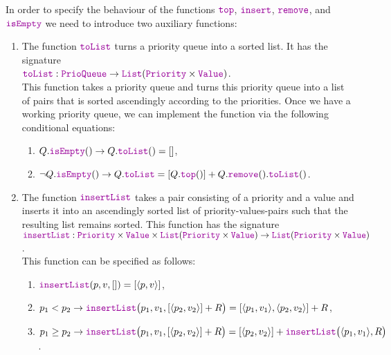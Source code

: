 \begin{Definition}
\begin{enumerate}
      In order to specify the behaviour of the functions $\mytt{top}$, $\mytt{insert}$, $\mytt{remove}$,
      and $\mytt{isEmpty}$ we need to introduce two auxiliary functions:  
      \begin{enumerate}
      \item The function $\mytt{toList}$ turns a priority queue into a sorted list.  It has the signature
            \\[0.2cm]
            \hspace*{1.3cm}
            $\mytt{toList}: \mytt{PrioQueue} \rightarrow \mytt{List}(\mytt{Priority} \times \mytt{Value})$.
            \\[0.2cm]
            This function takes a priority queue and turns this priority queue into a list of pairs that is
            sorted ascendingly according to the priorities. Once we have a working priority queue, we can
            implement the function  via the following conditional equations: 
            \begin{enumerate}
            \item $Q.\mytt{isEmpty}() \rightarrow Q.\mytt{toList}() = []$,
            \item $\neg Q.\mytt{isEmpty}() \rightarrow Q.\mytt{toList} = [Q.\mytt{top}()] + Q.\mytt{remove}().\mytt{toList}()$.
            \end{enumerate}
      \item The function $\mytt{insertList}$ takes a pair consisting of a priority and a value and inserts it
            into an ascendingly sorted list of priority-values-pairs such that the resulting list remains
            sorted.  This function has the signature
            \\[0.2cm]
            \hspace*{-0.5cm}
            $\mytt{insertList}: \mytt{Priority} \times \mytt{Value} \times \mytt{List}(\mytt{Priority} \times \mytt{Value}) 
             \rightarrow \mytt{List}(\mytt{Priority} \times \mytt{Value})
            $.
            \\[0.2cm]
            This function can be specified as follows:
            \begin{enumerate}
            \item $\mytt{insertList}(p,v,[]) = [\langle p,v\rangle ]$,
            \item $p_1 <    p_2 \rightarrow \mytt{insertList}\bigl(p_1,v_1,[\pair(p_2,v_2)] + R\bigr) = [\pair(p_1,v_1), \pair(p_2,v_2)] + R$,
            \item $p_1 \geq p_2 \rightarrow \mytt{insertList}\bigl(p_1,v_1,[\pair(p_2,v_2)] + R\bigr) = [\pair(p_2,v_2)] + \mytt{insertList}\bigl(\pair(p_1,v_1), R\bigr)$.

\end{enumerate}
\end{enumerate}
\end{enumerate}
\end{Definition}
